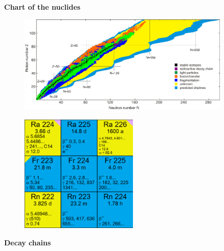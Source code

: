 \documentclass[aspectratio=1610,pdftex,dvipsnames,compress,xcolor={dvipsnames}]{beamer}
\begin{document}
\begin{frame}[plain]{}
    \centering\LARGE\textbf{Chart of the nuclides}
\end{frame}


\addtocounter{framenumber}{-1}
\begin{frame}{}
    \begin{figure}
        \centering
        \href{https://www.nndc.bnl.gov/chart/}{\includegraphics[width=0.90\textwidth]{chart.jpg}}
    \end{figure}
\end{frame}


\begin{frame}{}
    \begin{figure}
        \centering
        \includegraphics[width=0.50\textwidth]{chart.example.jpg}
    \end{figure}
\end{frame}


\begin{frame}[plain]{}
    \centering\LARGE\textbf{Decay chains}
\end{frame}
\end{document}
